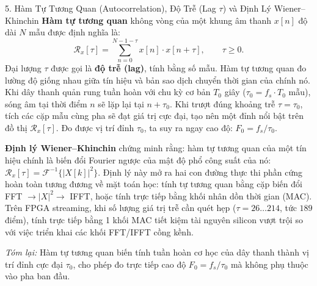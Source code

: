 \begin{feynmanbox}{5. Hàm Tự Tương Quan (Autocorrelation), Độ Trễ (Lag $\tau$) và Định Lý Wiener--Khinchin}
\textbf{Hàm tự tương quan} không vòng của một khung âm thanh $x[n]$ độ dài $N$ mẫu được định nghĩa là:
\[
\mathcal{R}_x[\tau] = \sum_{n=0}^{N-1-\tau} x[n] \cdot x[n+\tau], \qquad \tau \ge 0.
\]
Đại lượng $\tau$ được gọi là \textbf{độ trễ (lag)}, tính bằng số mẫu. Hàm tự tương quan đo lường độ giống nhau giữa tín hiệu và bản sao dịch chuyển thời gian của chính nó. Khi dây thanh quản rung tuần hoàn với chu kỳ cơ bản $T_0$ giây ($\tau_0 = f_s \cdot T_0$ mẫu), sóng âm tại thời điểm $n$ sẽ lặp lại tại $n + \tau_0$. Khi trượt đúng khoảng trễ $\tau = \tau_0$, tích các cặp mẫu cùng pha sẽ đạt giá trị cực đại, tạo nên một đỉnh nổi bật trên đồ thị $\mathcal{R}_x[\tau]$. Đo được vị trí đỉnh $\tau_0$, ta suy ra ngay cao độ: $F_0 = f_s / \tau_0$.

\textbf{Định lý Wiener--Khinchin} chứng minh rằng: hàm tự tương quan của một tín hiệu chính là biến đổi Fourier ngược của mật độ phổ công suất của nó: $\mathcal{R}_x[\tau] = \mathcal{F}^{-1}\{|X[k]|^2\}$. Định lý này mở ra hai con đường thực thi phần cứng hoàn toàn tương đương về mặt toán học: tính tự tương quan bằng cặp biến đổi FFT $\to |X|^2 \to$ IFFT, hoặc tính trực tiếp bằng khối nhân dồn thời gian (MAC). Trên FPGA streaming, khi số lượng giá trị trễ cần quét hẹp ($\tau = 26 \ldots 214$, tức $189$ điểm), tính trực tiếp bằng 1 khối MAC tiết kiệm tài nguyên silicon vượt trội so với việc triển khai các khối FFT/IFFT cồng kềnh.

\emph{Tóm lại:} Hàm tự tương quan biến tính tuần hoàn cơ học của dây thanh thành vị trí đỉnh cực đại $\tau_0$, cho phép đo trực tiếp cao độ $F_0 = f_s/\tau_0$ mà không phụ thuộc vào pha ban đầu.
\end{feynmanbox}

